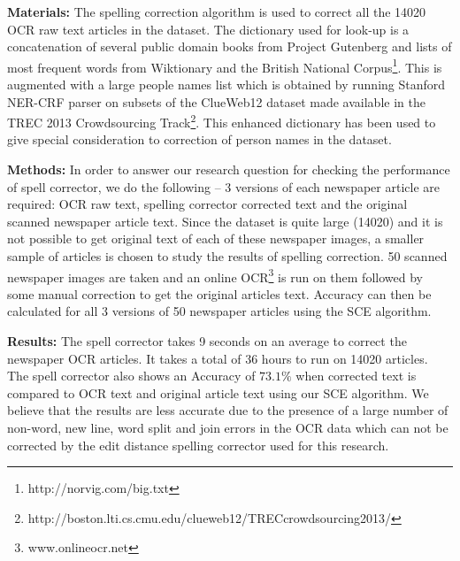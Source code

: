 \documentclass[preprint,11pt]{elsarticle}
\begin{document}
\noindent \textbf{Materials: }The spelling correction algorithm is used to correct all the 14020 OCR raw text articles in the dataset. The dictionary used for look-up is a concatenation of several public domain books from Project Gutenberg and lists of most frequent words from Wiktionary and the British National Corpus\footnote{http://norvig.com/big.txt}. This is augmented with a large people names list which is obtained  by running Stanford NER-CRF parser on subsets of the ClueWeb12 dataset made available in the TREC 2013 Crowdsourcing Track\footnote{http://boston.lti.cs.cmu.edu/clueweb12/TRECcrowdsourcing2013/}. This enhanced dictionary has been used to give special consideration to correction of person names in the dataset.

\noindent \textbf{Methods: }In order to answer our research question for checking the performance of spell corrector, we do the following -- 3 versions of each newspaper article are required: OCR raw text, spelling corrector corrected text and the original scanned newspaper article text. Since the dataset is quite large (14020) and it is not possible to get original text of each of these newspaper images, a smaller sample of articles is chosen to study the results of spelling correction. 50 scanned newspaper images are taken and an online OCR\footnote{www.onlineocr.net} is run on them followed by some manual correction to get the original articles text. Accuracy can then be calculated for all 3 versions of 50 newspaper articles using the SCE algorithm. 

\noindent \textbf{Results: }
The spell corrector takes 9 seconds on an average to correct the newspaper OCR articles. It takes a total of 36 hours to run on 14020 articles.
The spell corrector also shows an Accuracy of $73.1 \%$  when corrected text is compared to OCR text and original article text using our SCE algorithm. We believe that the results are less accurate due to the presence of a large number of non-word, new line, word split and join errors in the OCR data which can not be corrected by the edit distance spelling corrector used for this research. 
\end{document}
